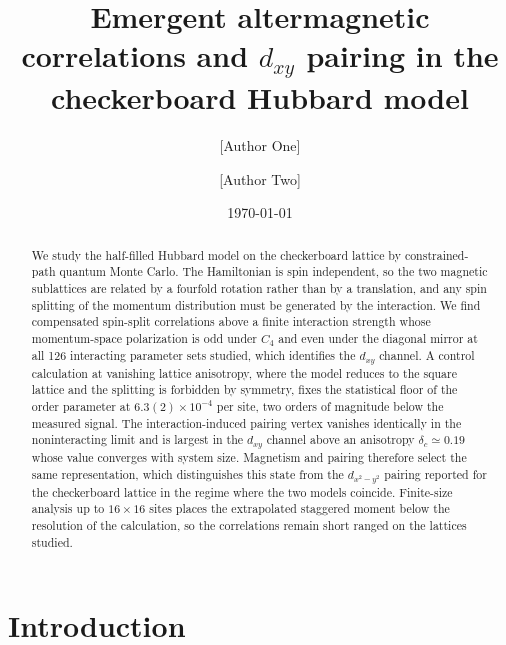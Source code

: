 \documentclass[aps,prb,reprint,superscriptaddress,amsmath,amssymb,floatfix]{revtex4-2}
\begin{document}
\title{Emergent altermagnetic correlations and $d_{xy}$ pairing in the
checkerboard Hubbard model}

\author{[Author One]}
\affiliation{[Affiliation]}
\author{[Author Two]}
\affiliation{[Affiliation]}

\date{\today}

\begin{abstract}
We study the half-filled Hubbard model on the checkerboard lattice by
constrained-path quantum Monte Carlo. The Hamiltonian is spin independent, so
the two magnetic sublattices are related by a fourfold rotation rather than by a
translation, and any spin splitting of the momentum distribution must be
generated by the interaction. We find compensated spin-split correlations above
a finite interaction strength whose momentum-space polarization is odd under
$C_4$ and even under the diagonal mirror at all 126 interacting parameter sets
studied, which identifies the $d_{xy}$ channel. A control calculation at
vanishing lattice anisotropy, where the model reduces to the square lattice and
the splitting is forbidden by symmetry, fixes the statistical floor of the order
parameter at $6.3(2)\times10^{-4}$ per site, two orders of magnitude below the
measured signal. The interaction-induced pairing vertex vanishes identically in
the noninteracting limit and is largest in the $d_{xy}$ channel above an
anisotropy $\delta_c \simeq 0.19$ whose value converges with system size.
Magnetism and pairing therefore select the same representation, which
distinguishes this state from the $d_{x^2-y^2}$ pairing reported for the
checkerboard lattice in the regime where the two models coincide. Finite-size
analysis up to $16\times16$ sites places the extrapolated staggered moment below
the resolution of the calculation, so the correlations remain short ranged on
the lattices studied.
\end{abstract}

\maketitle


\section{Introduction}
\end{document}
